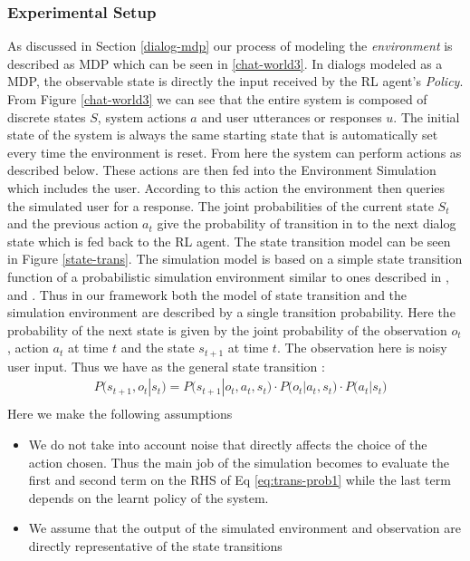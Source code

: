 \documentclass[14pt]{extarticle}
\numberwithin{equation}{section}
\begin{document}
	\subsubsection{Experimental Setup}\label{expt-setup}
	As discussed in Section \ref{dialog-mdp} our process of modeling the \textit{environment} is described as MDP which can be seen in \ref{chat-world3}. In dialogs modeled as a MDP, the observable state is directly the input received by the RL agent's \textit{Policy}. From Figure \ref{chat-world3} we can see that the entire system is composed of discrete states $S$, system actions $a$ and user utterances or responses $u$. The initial state of the system is always the same starting state that is automatically set every time the environment is reset. From here the system can perform actions as described below. These actions are then fed into the Environment Simulation which includes the user. According to this action the environment then queries the simulated user for a response. The joint probabilities of the current state $S_t$	and the previous action $a_t$ give the probability of transition in to the next dialog state which is fed back to the RL agent. The state transition model can be seen in Figure \ref{state-trans}. The simulation model is based on a simple state transition function of a probabilistic simulation environment similar to ones described in \cite{Singh_mdp}, \cite{walker2000evaluation} and \cite{roy2000spoken}. Thus in our framework both the model of state transition and the simulation environment are described by a single transition probability. Here the probability of the next state is given by the joint probability of the observation $o_t$, action $a_t$ at time $t$ and the state $s_{t+1}$ at time $t$. The observation here is noisy user input. Thus we have as the general state transition :
	\begin{align}\label{eq:trans-prob1}
	&P\big(s_{t+1},o_t | s_t\big) = P\big(s_{t+1} | o_t,a_t,s_t \big)\cdot P\big(o_t | a_t,s_t\big)\cdot P\big(a_t | s_t\big) \nonumber\\
	\end{align}
	Here we make the following assumptions
	\begin{itemize}
		\item We do not take into account noise that directly affects the choice of the action chosen. Thus the main job of the simulation becomes to evaluate the first and second term on the RHS of Eq \ref{eq:trans-prob1} while the last term depends on the learnt policy of the system.
		\item We assume that the output of the simulated environment and observation are directly representative of the state transitions
	\end{itemize}
\end{document}
